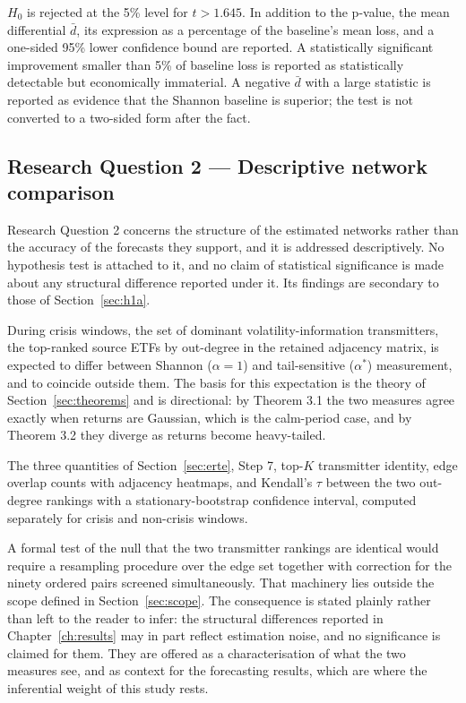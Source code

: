 \documentclass[12pt,oneside]{report}
\begin{document}
$H_0$ is rejected at the 5\% level for $t > 1.645$. In addition to the
p-value, the mean differential $\bar{d}$, its expression as a percentage
of the baseline's mean loss, and a one-sided 95\% lower confidence bound
are reported. A statistically significant improvement smaller than 5\%
of baseline loss is reported as statistically detectable but
economically immaterial. A negative $\bar{d}$ with a large statistic is
reported as evidence that the Shannon baseline is superior; the test is
not converted to a two-sided form after the fact.

\subsection{Research Question 2 --- Descriptive network comparison}

Research Question 2 concerns the structure of the estimated networks
rather than the accuracy of the forecasts they support, and it is
addressed descriptively. No hypothesis test is attached to it, and no
claim of statistical significance is made about any structural
difference reported under it. Its findings are secondary to those of
Section~\ref{sec:h1a}.

During crisis windows, the set of dominant volatility-information
transmitters, the top-ranked source ETFs by out-degree in the retained
adjacency matrix, is expected to differ between Shannon ($\alpha = 1$)
and tail-sensitive ($\alpha^{*}$) measurement, and to coincide outside
them. The basis for this expectation is the theory of
Section~\ref{sec:theorems} and is directional: by Theorem 3.1 the two
measures agree exactly when returns are Gaussian, which is the
calm-period case, and by Theorem 3.2 they diverge as returns become
heavy-tailed.

The three quantities of Section~\ref{sec:erte}, Step 7, top-$K$
transmitter identity, edge overlap counts with adjacency heatmaps, and
Kendall's $\tau$ between the two out-degree rankings with a
stationary-bootstrap confidence interval, computed separately for crisis
and non-crisis windows.

A formal test of the null that the two transmitter rankings are
identical would require a resampling procedure over the edge set
together with correction for the ninety ordered pairs screened
simultaneously. That machinery lies outside the scope defined in
Section~\ref{sec:scope}. The consequence is stated plainly rather than
left to the reader to infer: the structural differences reported in
Chapter~\ref{ch:results} may in part reflect estimation noise, and no
significance is claimed for them. They are offered as a characterisation
of what the two measures see, and as context for the forecasting
results, which are where the inferential weight of this study rests.
\end{document}

